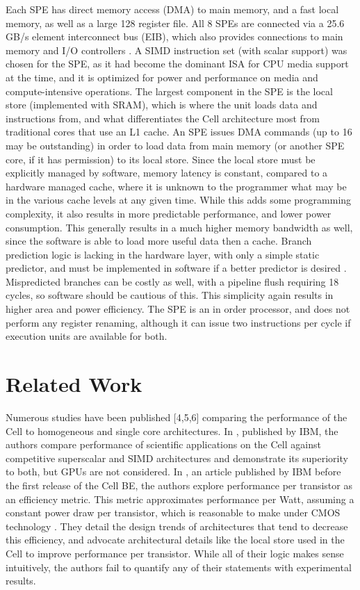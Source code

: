 \documentclass{sig-alternate-05-2015}
\begin{document}
Each SPE has direct memory access (DMA) to main memory, and a fast local memory, as well as a large 128 register file. All 8 SPEs are connected via a 25.6 GB/s element interconnect bus (EIB), which also provides connections to main memory and I/O controllers \cite{kahle2005introduction}. A SIMD instruction set (with scalar support) was chosen for the SPE, as it had become the dominant ISA for CPU media support at the time, and it is optimized for power and performance on media and compute-intensive operations.
The largest component in the SPE is the local store (implemented with SRAM), which is where the unit loads data and instructions from, and what differentiates the Cell architecture most from traditional cores that use an L1 cache. An SPE issues DMA commands (up to 16 may be outstanding) in order to load data from main memory (or another SPE core, if it has permission) to its local store. Since the local store must be explicitly managed by software, memory latency is constant, compared to a hardware managed cache, where it is unknown to the programmer what may be in the various cache levels at any given time. While this adds some programming complexity, it also results in more predictable performance, and lower power consumption. This generally results in a much higher memory bandwidth as well, since the software is able to load more useful data then a cache. Branch prediction logic is lacking in the hardware layer, with only a simple static predictor, and must be implemented in software if a better predictor is desired \cite{flachs2006microarchitecture}. Mispredicted branches can be costly as well, with a pipeline flush requiring 18 cycles, so software should be cautious of this. This simplicity again results in higher area and power efficiency. The SPE is an in order processor, and does not perform any register renaming, although it can issue two instructions per cycle if execution units are available for both.

\section{Related Work}

Numerous studies have been published [4,5,6] comparing the performance of the Cell to homogeneous and single core architectures. In \cite{chen2007cell}, published by IBM, the authors compare performance of scientific applications on the Cell against competitive superscalar and SIMD architectures and demonstrate its superiority to both, but GPUs are not considered.
In \cite{hofstee2005power}, an article published by IBM before the first release of the Cell BE, the authors explore performance per transistor as an efficiency metric. This metric approximates performance per Watt, assuming a constant power draw per transistor, which is reasonable to make under CMOS technology \cite{hofstee2005power}. They detail the design trends of architectures that tend to decrease this efficiency, and advocate architectural details like the local store used in the Cell to improve performance per transistor. While all of their logic makes sense intuitively, the authors fail to quantify any of their statements with experimental results.
\end{document}
